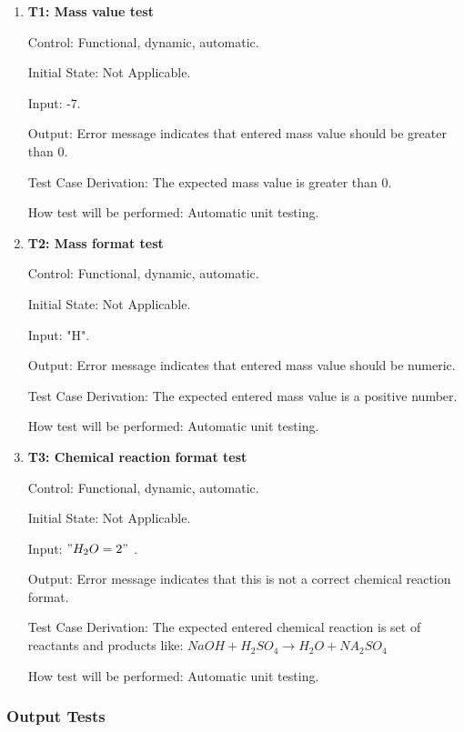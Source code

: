 \documentclass[12pt, titlepage]{article}
\begin{document}
\begin{enumerate}

\item{\bf T1: Mass value test\\}

Control:  Functional, dynamic, automatic.
					
Initial State: Not Applicable.
					
Input:  -7.
					
Output: Error message indicates that entered mass value should be greater than 0.

Test Case Derivation: The expected mass value is greater than 0. 
					
How test will be performed: Automatic unit testing. 

\item{\bf T2: Mass format test\\}

Control:  Functional, dynamic, automatic.
					
Initial State: Not Applicable.
					
Input:  "H".
					
Output: Error message indicates that entered mass value should be numeric.

Test Case Derivation: The expected entered mass value is a positive number.
					
How test will be performed: Automatic unit testing.

\item{\bf T3: Chemical reaction format test\\}

Control:  Functional, dynamic, automatic.
					
Initial State: Not Applicable.
					
Input: $"H_2O = 2"$ .
					
Output: Error message indicates that this is not a correct chemical reaction format. 

Test Case Derivation: The expected entered chemical reaction is set of reactants and products like: $NaOH + H_2SO_4 \rightarrow H_2O + NA_2SO_4$
					
How test will be performed: Automatic unit testing.
 
\end{enumerate}

\subsubsection{Output Tests}
\end{document}
